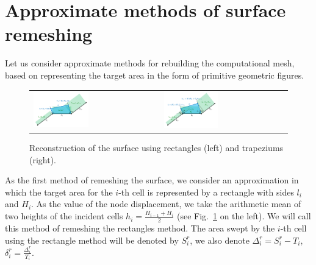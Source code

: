 \documentclass[
11pt,%
tightenlines,%
twoside,%
onecolumn,%
nofloats,%
nobibnotes,%
nofootinbib,%
superscriptaddress,%
noshowpacs,%
centertags]%
{revtex4}
\begin{document}
\section{Approximate methods of surface remeshing}

Let us consider approximate methods for rebuilding the computational mesh, based on representing the target area in the form of primitive geometric figures.

\begin{figure}[ht]
\setcaptionmargin{5mm}
\onelinecaptionstrue  %
\begin{tabular}{ll}
\includegraphics[width=0.45\textwidth]{pics/remesh_rectangles.pdf}
&
\includegraphics[width=0.45\textwidth]{pics/remesh_trapeziums.pdf}
\end{tabular}
\caption{Reconstruction of the surface using rectangles (left) and trapeziums (right).}
\label{fig:text_1_remesh_2d_rectangles_and_trapeziums}
\end{figure}

As the first method of remeshing the surface, we consider an approximation in which the target area for the $i$-th cell is represented by a rectangle with sides $l_i$ and $H_i$.
As the value of the node displacement, we take the arithmetic mean of two heights of the incident cells $h_i = \frac{H_{i - 1} + H_i}{2}$ (see Fig.~\ref{fig:text_1_remesh_2d_rectangles_and_trapeziums} on the left).
We will call this method of remeshing the rectangles method.
The area swept by the $i$-th cell using the rectangle method will be denoted by $S_i^r$, we also denote $\Delta_i^r = S_i^r - T_i$, $\delta_i^r = \frac{\Delta_i^r}{T_i}$.
\end{document}
